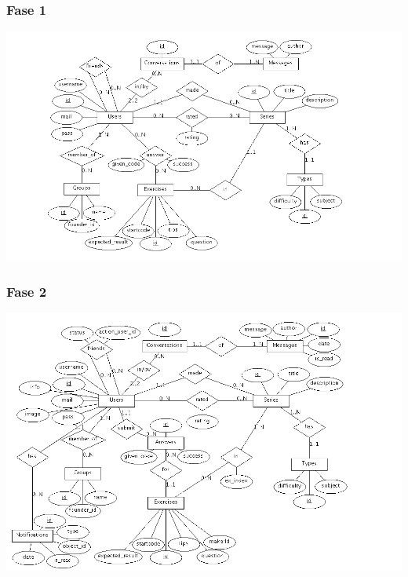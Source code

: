 \subsubsection{Fase 1}
\mbox{\hspace{-16ex}\includegraphics[keepaspectratio=true, scale=0.6]{raport_files/design/ProjectDatabasesER.png}}
\subsubsection{Fase 2}
\mbox{\hspace{-16ex}\includegraphics[keepaspectratio=true, scale=0.6]{raport_files/design/ProjectDatabasesER-Fase2.png}}
